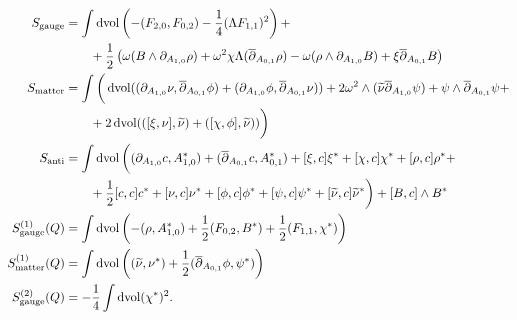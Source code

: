\documentclass[10pt, oneside]{article}
\newcommand{\gauge}{\mathrm{gauge}}
\newcommand{\matter}{\mathrm{matter}}
\begin{document}
\begin{align*}
S_{\gauge} &= \int \dvol \left(-(F_{2, 0}, F_{0, 2}) - \frac{1}{4}(\Lambda F_{1, 1})^2\right) + \\
&\qquad + \frac 12 \left( \omega(B \wedge \dd_{A_{1,0}} \rho) + \omega^2\chi\Lambda(\ol \dd_{A_{0,1}} \rho) - \omega(\rho \wedge \dd_{A_{1,0}} B) + \xi \ol \dd_{A_{0,1}} B \right)  \\
S_{\matter} &= \int \bigg( \dvol ((\dd_{A_{1,0}}\nu, \ol \dd_{A_{0,1}} \phi) + (\dd_{A_{1,0}}\phi, \ol \dd_{A_{0,1}} \nu)) + 2\omega^2\wedge(\wt\nu \ol \dd_{A_{1,0}} \psi) + \psi \wedge \ol \dd_{A_{0,1}} \psi + \\
&\qquad + 2\dvol(([\xi,\nu],\wt\nu) + ([\chi, \phi], \wt\nu) )   \bigg) \\
S_{\mr{anti}} &= \int \dvol \bigg( (\dd_{A_{1, 0}} c, A_{1, 0}^*) + (\ol\dd_{A_{0, 1}} c, A_{0, 1}^*)  +  [\xi, c] \xi^* + [\chi, c]\chi^* +[\rho, c] \rho^* + \\
&\qquad + \frac{1}{2}[c, c]c^* + [\nu, c] \nu^* + [\phi, c] \phi^* + [\psi, c] \psi^* + [\wt\nu, c] \wt\nu^* \bigg) + [B, c]\wedge B^* \\
S^{(1)}_{\gauge} (Q) &=  \int \dvol \left( - (\rho, A_{1,0}^*) + \frac 12 (F_{0,2},B^*) + \frac 12 (F_{1,1}, \chi^*)  \right)\\
S^{(1)}_{\matter} (Q) &=  \int \dvol \left( (\wt\nu, \nu^*) + \frac 12( \ol \dd_{A_{0,1}} \phi, \psi^*) \right)\\
S^{(2)}_{\gauge} (Q) &= -\frac{1}{4}\int \dvol (\chi^*)^2.
\end{align*}
\end{document}
